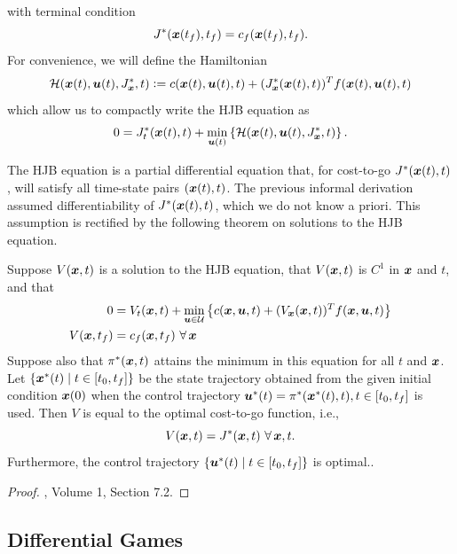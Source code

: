 with terminal condition
\begin{equation}
    J^*(\bm{x}(t_f),t_f) = c_f(\bm{x}(t_f),t_f).
\end{equation}
For convenience, we will define the Hamiltonian 
\begin{equation}
    \mathcal{H}(\bm{x}(t),\bm{u}(t),J^*_{\bm{x}},t) \vcentcolon= c(\bm{x}(t),\bm{u}(t),t) + (J_{\bm{x}}^*(\bm{x}(t),t))^T f(\bm{x}(t),\bm{u}(t),t)
\end{equation}
which allow us to compactly write the HJB equation as 
\begin{equation}
    0 = J^*_t(\bm{x}(t),t) + \min_{\bm{u}(t)} \left\{ \mathcal{H}(\bm{x}(t),\bm{u}(t),J^*_{\bm{x}},t) \right\}.
\end{equation}

The HJB equation is a partial differential equation that, for cost-to-go $J^*(\bm{x}(t),t)$, will satisfy all time-state pairs $(\bm{x}(t),t)$. The previous informal derivation assumed differentiability of $J^*(\bm{x}(t),t)$, which we do not know a priori. This assumption is rectified by the following theorem on solutions to the HJB equation. 

\begin{theorem}
Suppose $V(\bm{x},t)$ is a solution to the HJB equation, that $V(\bm{x},t)$ is $C^1$ in $\bm{x}$ and $t$, and that
\begin{align*}
    0 &= V_t(\bm{x},t) + \min_{\bm{u} \in \mathcal{U}} \left\{ c(\bm{x},\bm{u},t) + (V_{\bm{x}}(\bm{x},t))^T f(\bm{x},\bm{u},t) \right\}\\
    V(\bm{x},t_f) &= c_f(\bm{x},t_f)\,\, \forall \, \bm{x}
\end{align*}
Suppose also that $\pi^*(\bm{x},t)$ attains the minimum in this equation for all $t$ and $\bm{x}$. Let $\{\bm{x}^*(t) \mid t \in [t_0, t_f]\}$ be the state trajectory obtained from the given initial condition $\bm{x}(0)$ when the control trajectory $\bm{u}^*(t) = \pi^*(\bm{x}^*(t),t), t \in [t_0, t_f]$ is used. Then $V$ is equal to the optimal cost-to-go function, i.e.,
\begin{equation}
    V(\bm{x},t) = J^*(\bm{x},t)\,\, \forall\, \bm{x}, t.
\end{equation}
Furthermore, the control trajectory $\{\bm{u}^*(t)\mid t \in [t_0, t_f]\}$ is optimal..
\end{theorem}

\begin{proof}
\cite{bertsekas1995dynamic}, Volume 1, Section 7.2.
\end{proof}


\subsection{Differential Games}

